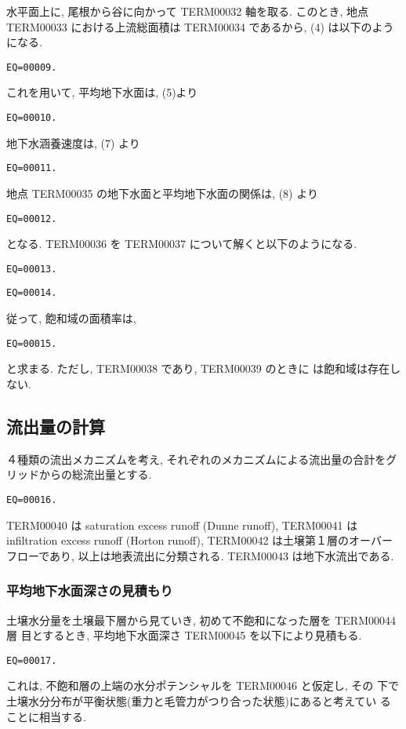 水平面上に, 尾根から谷に向かって TERM00032 軸を取る.
このとき, 地点 TERM00033 における上流総面積は TERM00034 であるから, (4)
は以下のようになる.
\begin{verbatim}
EQ=00009.
\end{verbatim}
これを用いて, 平均地下水面は, (5)より
\begin{verbatim}
EQ=00010.
\end{verbatim}
地下水涵養速度は, (7) より
\begin{verbatim}
EQ=00011.
\end{verbatim}
地点 TERM00035 の地下水面と平均地下水面の関係は, (8) より
\begin{verbatim}
EQ=00012.
\end{verbatim}
となる.
TERM00036 を TERM00037 について解くと以下のようになる.
\begin{verbatim}
EQ=00013.
\end{verbatim}
\begin{verbatim}
EQ=00014.
\end{verbatim}
従って, 飽和域の面積率は,
\begin{verbatim}
EQ=00015.
\end{verbatim}
と求まる. ただし, TERM00038 であり, TERM00039 のときに
は飽和域は存在しない.

\subsection{流出量の計算}

４種類の流出メカニズムを考え, それぞれのメカニズムによる流出量の合計をグ
リッドからの総流出量とする.
\begin{verbatim}
EQ=00016.
\end{verbatim}
TERM00040 は saturation excess runoff (Dunne runoff), TERM00041 は
infiltration excess runoff (Horton runoff), TERM00042 は土壌第１層のオーバー
フローであり, 以上は地表流出に分類される. TERM00043 は地下水流出である.

\subsubsection{平均地下水面深さの見積もり}

土壌水分量を土壌最下層から見ていき, 初めて不飽和になった層を TERM00044 層
目とするとき, 平均地下水面深さ TERM00045 を以下により見積もる.
\begin{verbatim}
EQ=00017.
\end{verbatim}
これは, 不飽和層の上端の水分ポテンシャルを TERM00046 と仮定し, その
下で土壌水分分布が平衡状態(重力と毛管力がつり合った状態)にあると考えてい
ることに相当する.

